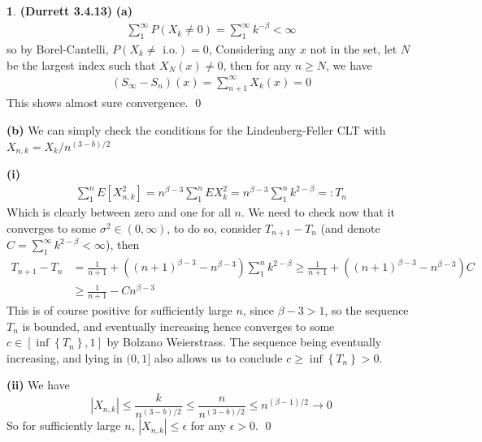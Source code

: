 \documentclass{article}
\theoremstyle{definition}
\newtheorem{pb}{}
\newcommand{\set}[1]{\left\{#1\right\}}
\newcommand{\abs}[1]{\left\vert#1\right\vert}
\begin{document}
    \begin{pb}\textbf{(Durrett 3.4.13)}
        \textbf{(a)}
        \begin{align*}
            \sum_1^\infty P(X_k \neq 0) = \sum_1^\infty k^{-\beta} <\infty
        \end{align*}
        so by Borel-Cantelli, \(P(X_k \neq \text{ i.o.}) = 0\), Considering any \(x\) not in the set, let \(N\) be the largest index such that \(X_N(x) \neq 0\), then for any \(n \geq N\), we have
        \begin{align*}
            (S_\infty - S_n)(x) = \sum_{n+1}^\infty X_k(x) = 0
        \end{align*}
        This shows almost sure convergence. \qed

        \textbf{(b)} We can simply check the conditions for the Lindenberg-Feller CLT with \(X_{n,k} = X_k/n^{(3-b)/2}\)

        \textbf{(i)}
        \begin{align*}
            \sum_1^n E[X_{n,k}^2] = n^{\beta - 3}\sum_1^n EX_k^2 = n^{\beta - 3}\sum_1^n k^{2-\beta} =: T_n
        \end{align*}
        Which is clearly between zero and one for all \(n\). We need to check now that it converges to some \(\sigma^2 \in (0,\infty)\), to do so, consider \(T_{n+1} - T_n\) (and denote \(C = \sum_1^\infty k^{2-\beta} < \infty\)), then
        \begin{align*}
            T_{n+1} - T_n &= \frac{1}{n+1} + ((n+1)^{\beta-3} - n^{\beta-3})\sum_1^nk^{2-\beta} \geq \frac{1}{n+1} + ((n+1)^{\beta-3} - n^{\beta-3})C \\
            & \geq \frac{1}{n+1} - Cn^{\beta-3}
        \end{align*}
        This is of course positive for sufficiently large \(n\), since \(\beta-3 > 1\), so the sequence \(T_n\) is bounded, and eventually increasing hence converges to some \(c \in [\inf\set{T_n}, 1]\) by Bolzano Weierstrass. The sequence being eventually increasing, and lying in \((0,1]\) also allows us to conclude \(c \geq \inf\set{T_n} > 0\).

        \textbf{(ii)} We have \[\abs{X_{n,k}} \leq \frac{k}{n^{(3-b)/2}} \leq \frac{n}{n^{(3-b)/2}} \leq n^{(\beta - 1)/2} \to 0\]
        So for sufficiently large \(n\), \(\abs{X_{n,k}} \leq \epsilon\) for any \(\epsilon > 0\). \qed


\end{pb}
\end{document}
